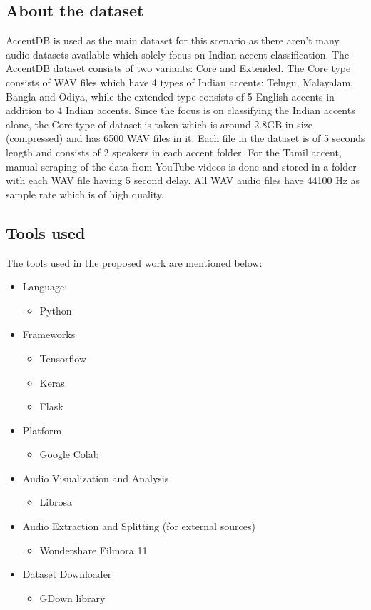 \documentclass[pdflatex]{sn-jnl}%
\theoremstyle{thmstyleone}%
\theoremstyle{thmstyletwo}%
\theoremstyle{thmstylethree}%
\begin{document}
\subsection{About the dataset}\label{subsec1}
AccentDB is used as the main dataset for this scenario as there aren’t many audio datasets available which solely focus on Indian accent classification. The AccentDB dataset consists of two variants: Core and Extended. The Core type consists of WAV files which have 4 types of Indian accents: Telugu, Malayalam, Bangla and Odiya, while the extended type consists of 5 English accents in addition to
4 Indian accents. Since the focus is on classifying the Indian accents alone, the Core type of dataset is taken which is around 2.8GB in size (compressed) and has 6500 WAV files in it. Each file in the dataset is of 5 seconds length and consists
of 2 speakers in each accent folder. For the Tamil accent, manual scraping of the data from YouTube videos is done and stored in a folder with each WAV file having 5 second delay. All WAV audio files have 44100 Hz as sample rate which is
of high quality.

\subsection{Tools used}\label{subsec2}
The tools used in the proposed work are mentioned below:
\begin{itemize}
    \item Language:
    \begin{itemize}
        \item Python
    \end{itemize}
    \item Frameworks
    \begin{itemize}
        \item Tensorflow
        \item Keras
        \item Flask
    \end{itemize}
    \item Platform
    \begin{itemize}
        \item Google Colab
    \end{itemize}
    \item Audio Visualization and Analysis
    \begin{itemize}
        \item Librosa
    \end{itemize}
    \item Audio Extraction and Splitting (for external sources)
    \begin{itemize}
        \item Wondershare Filmora 11 
    \end{itemize}
    \item Dataset Downloader
    \begin{itemize}
        \item GDown library
    \end{itemize}
\end{itemize}
\end{document}
